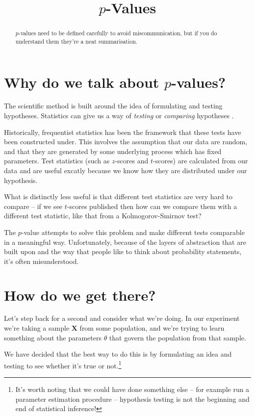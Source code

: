 \documentclass{tufte-handout}
\title{$p$-Values}
\author{}
\theoremstyle{plain}
\theoremstyle{definition}
\newcommand{\XX}{\mathbf{X}}
\begin{document}
\maketitle

\begin{abstract}
    \noindent
    $p$-values need to be defined carefully to avoid miscommunication, but if you do understand them they're a neat summarisation.
\end{abstract}

\section{Why do we talk about $p$-values?}

The scientific method is built around the idea of formulating and testing hypotheses.
Statistics can give us a way of \textit{testing} or \textit{comparing} hypotheses \cite{casella2021statistical}.

Historically, frequentist statistics has been the framework that these tests have been constructed under.
This involves the assumption that our data are random, and that they are generated by some underlying process which has fixed parameters.
Test statistics (such as $z$-scores and $t$-scores) are calculated from our data and are useful excatly because we know how they are distributed under our hypothesis.

What is distinctly less useful is that different test statistics are very hard to compare -- if we see $t$-scores published then how can we compare them with a different test statistic, like that from a Kolmogorov-Smirnov test?

The $p$-value attempts to solve this problem and make different tests comparable in a meaningful way.
Unfortunately, because of the layers of abstraction that are built upon and the way that people like to think about probability statements, it's often misunderstood.

\section{How do we get there?}

Let's step back for a second and consider what we're doing.
In our experiment we're taking a sample $\XX$ from some population, and we're trying to learn something about the parameters $\theta$ that govern the population from that sample.

We have decided that the best way to do this is by formulating an idea and testing to see whether it's true or not.\footnote{It's worth noting that we could have done something else -- for example run a parameter estimation procedure -- hypothesis testing is not the beginning and end of statistical inference!}
\end{document}
